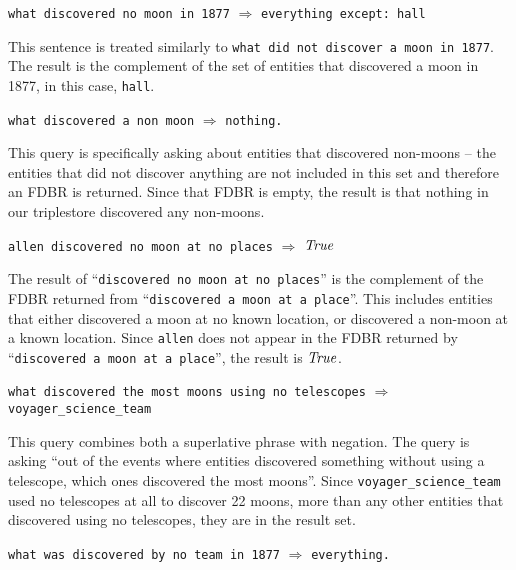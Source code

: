 \documentclass[../main.tex]{subfiles}
\begin{document}
\begin{refsection}
\examplespacing

\texttt{what discovered no moon in 1877} $\Rightarrow$ \texttt{everything except: hall}

\examplespacing

\noindent This sentence is treated similarly to \texttt{what did not discover a moon in 1877}.  The result is the complement of the set of entities that discovered a moon in 1877, in this case, \texttt{hall}.

\examplespacing

\texttt{what discovered a non moon} $\Rightarrow$ \texttt{nothing.}

\examplespacing

\noindent This query is specifically asking about entities that discovered non-moons -- the entities that did not discover anything are not included in this set and therefore an FDBR is returned.  Since that FDBR is empty, the result is that nothing in our triplestore discovered any non-moons.

\examplespacing

\texttt{allen discovered no moon at no places} $\Rightarrow$ $\mathit{True}$

\examplespacing

\noindent The result of ``\texttt{discovered no moon at no places}'' is the complement of the FDBR returned from ``\texttt{discovered a moon at a place}''.  This includes entities that either discovered a moon at no known location, or discovered a non-moon at a known location.  Since \texttt{allen} does not appear in the FDBR returned by ``\texttt{discovered a moon at a place}'', the result is $\mathit{True}$.

\examplespacing

\texttt{what discovered the most moons using no telescopes} $\Rightarrow$ \texttt{voyager\_science\_team}

\examplespacing

\noindent This query combines both a superlative phrase with negation.  The query is asking ``out of the events where entities discovered something without using a telescope, which ones discovered the most moons''.  Since \texttt{voyager\_science\_team} used no telescopes at all to discover 22 moons, more than any other entities that discovered using no telescopes, they are in the result set.

\examplespacing

\texttt{what was discovered by no team in 1877} $\Rightarrow$ \texttt{everything.}


\end{refsection}
\end{document}
